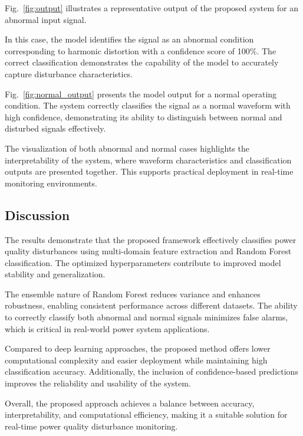 \documentclass[conference]{IEEEtran}
\begin{document}
Fig.~\ref{fig:output} illustrates a representative output of the proposed system for an abnormal input signal.

In this case, the model identifies the signal as an abnormal condition corresponding to harmonic distortion with a confidence score of 100\%. The correct classification demonstrates the capability of the model to accurately capture disturbance characteristics.

Fig.~\ref{fig:normal_output} presents the model output for a normal operating condition. The system correctly classifies the signal as a normal waveform with high confidence, demonstrating its ability to distinguish between normal and disturbed signals effectively.

The visualization of both abnormal and normal cases highlights the interpretability of the system, where waveform characteristics and classification outputs are presented together. This supports practical deployment in real-time monitoring environments.

\subsection{Discussion}

The results demonstrate that the proposed framework effectively classifies power quality disturbances using multi-domain feature extraction and Random Forest classification. The optimized hyperparameters contribute to improved model stability and generalization.

The ensemble nature of Random Forest reduces variance and enhances robustness, enabling consistent performance across different datasets. The ability to correctly classify both abnormal and normal signals minimizes false alarms, which is critical in real-world power system applications.

Compared to deep learning approaches, the proposed method offers lower computational complexity and easier deployment while maintaining high classification accuracy. Additionally, the inclusion of confidence-based predictions improves the reliability and usability of the system.

Overall, the proposed approach achieves a balance between accuracy, interpretability, and computational efficiency, making it a suitable solution for real-time power quality disturbance monitoring.
\end{document}
